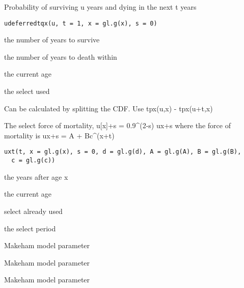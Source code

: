 \documentclass[a4paper]{book}
\begin{document}
%
\begin{Description}\relax
Probability of surviving u years and dying in the next t years
\end{Description}
%
\begin{Usage}
\begin{verbatim}
udeferredtqx(u, t = 1, x = gl.g(x), s = 0)
\end{verbatim}
\end{Usage}
%
\begin{Arguments}
\begin{ldescription}
\item[\code{u}] the number of years to survive

\item[\code{t}] the number of years to death within

\item[\code{x}] the current age

\item[\code{s}] the select used
\end{ldescription}
\end{Arguments}
%
\begin{Details}\relax
Can be calculated by splitting the CDF. Use tpx(u,x) - tpx(u+t,x)
\end{Details}
%
\begin{Description}\relax
The select force of mortality, u[x]+s = 0.9\textasciicircum{}(2-s) ux+s
where the force of mortality is ux+s = A + Bc\textasciicircum{}(x+t)
\end{Description}
%
\begin{Usage}
\begin{verbatim}
uxt(t, x = gl.g(x), s = 0, d = gl.g(d), A = gl.g(A), B = gl.g(B),
  c = gl.g(c))
\end{verbatim}
\end{Usage}
%
\begin{Arguments}
\begin{ldescription}
\item[\code{t}] the years after age x

\item[\code{x}] the current age

\item[\code{s}] select already used

\item[\code{d}] the select period

\item[\code{A}] Makeham model parameter

\item[\code{B}] Makeham model parameter

\item[\code{c}] Makeham model parameter
\end{ldescription}
\end{Arguments}
\end{document}
